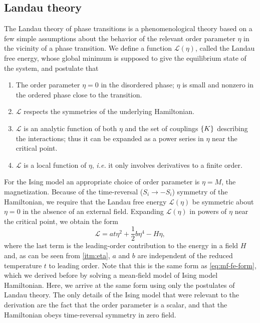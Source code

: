\subsection{Landau theory}
\label{sec:intro-landau}

The Landau theory of phase transitions is a phenomenological theory based on a
few simple assumptions about the behavior of the relevant order parameter
$\eta$ in the vicinity of a phase transition. We define a function
$\mathcal{L}(\eta)$, called the Landau free energy, whose global minimum is
supposed to give the equilibrium state of the system, and postulate that
\begin{enumerate}
  \item The order parameter $\eta=0$ in the disordered phase; $\eta$ is small
    and nonzero in the ordered phase close to the transition. \label{itm:eta}
  \item $\mathcal{L}$ respects the symmetries of the underlying Hamiltonian.
  \item $\mathcal{L}$ is an analytic function of both $\eta$ and the set of
    couplings $\cbr{K}$ describing the interactions; thus it can be expanded as
    a power series in $\eta$ near the critical point.
  \item $\mathcal{L}$ is a local function of $\eta$, \textit{i.e.} it only
    involves derivatives to a finite order.
\end{enumerate}

For the Ising model an appropriate choice of order parameter is $\eta=M$, the
magnetization. Because of the time-reversal ($S_i \to -S_i$) symmetry of the
Hamiltonian, we require that the Landau free energy $\mathcal{L}(\eta)$ be
symmetric about $\eta=0$ in the absence of an external field. Expanding
$\mathcal{L}(\eta)$ in powers of $\eta$ near the critical point, we obtain the
form
\begin{equation}
  \mathcal{L} = a t \eta^2 + \frac{1}{2} b \eta^4 - H \eta,
  \label{eq:landau-fe}
\end{equation}
where the last term is the leading-order contribution to the energy in a field
$H$ and, as can be seen from \cref{itm:eta}, $a$ and $b$ are independent of the
reduced temperature $t$ to leading order. Note that this is the same form as
\cref{eq:mf-fe-form}, which we derived before by solving a mean-field model of
Ising model Hamiltonian. Here, we arrive at the same form using only the
postulates of Landau theory. The only details of the Ising model that were
relevant to the derivation are the fact that the order parameter is a scalar,
and that the Hamiltonian obeys time-reversal symmetry in zero field.

